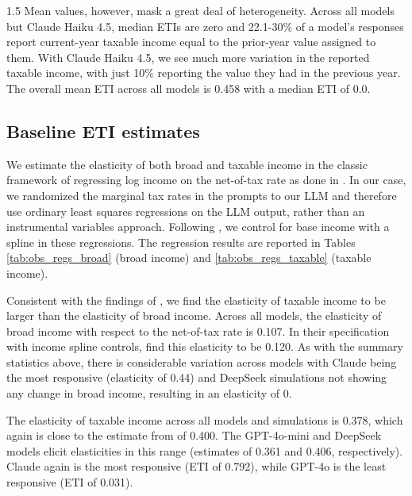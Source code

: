 \documentclass[letterpaper,9pt]{article}
\theoremstyle{definition}
\begin{document}
\begin{spacing}{1.5}
Mean values, however, mask a great deal of heterogeneity. Across all models but Claude Haiku 4.5, median ETIs are zero and 22.1-30\% of a model's responses report current-year taxable income equal to the prior-year value assigned to them. With Claude Haiku 4.5, we see much more variation in the reported taxable income, with just 10\% reporting the value they had in the previous year. The overall mean ETI across all models is 0.458 with a median ETI of 0.0.
\vspace{0.6cm}



\subsection{Baseline ETI estimates}

We estimate the elasticity of both broad and taxable income in the classic framework of regressing log income on the net-of-tax rate as done in \cite{GruberSaez2002}.  In our case, we randomized the marginal tax rates in the prompts to our LLM and therefore use ordinary least squares regressions on the LLM output, rather than an instrumental variables approach.  Following \cite{GruberSaez2002}, we control for base income with a spline in these regressions.  The regression results are reported in Tables \ref{tab:obs_regs_broad} (broad income) and \ref{tab:obs_regs_taxable} (taxable income).




Consistent with the findings of \cite{GruberSaez2002}, we find the elasticity of taxable income to be larger than the elasticity of broad income.  Across all models, the elasticity of broad income with respect to the net-of-tax rate is 0.107. In their specification with income spline controls, \cite{GruberSaez2002} find this elasticity to be 0.120. As with the summary statistics above, there is considerable variation across models with Claude being the most responsive (elasticity of 0.44) and DeepSeek simulations not showing any change in broad income, resulting in an elasticity of 0. 

The elasticity of taxable income across all models and simulations is 0.378, which again is close to the estimate from \cite{GruberSaez2002} of 0.400.  The GPT-4o-mini and DeepSeek models elicit elasticities in this range (estimates of 0.361 and 0.406, respectively).  Claude again is the most responsive (ETI of 0.792), while GPT-4o is the least responsive (ETI of 0.031).


\end{spacing}
\end{document}
